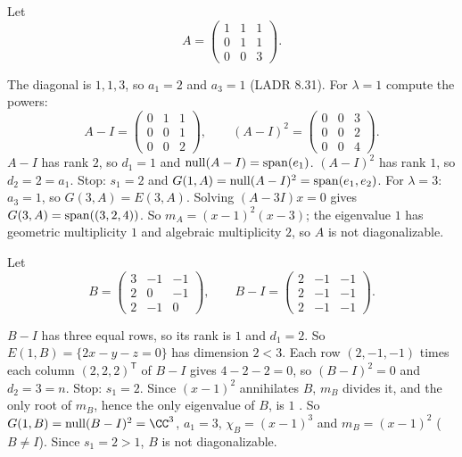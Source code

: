 \documentclass[10pt]{scrartcl}
\begin{document}
\begin{example*}
  Let
  \[
    A=\begin{pmatrix}1&1&1\\0&1&1\\0&0&3\end{pmatrix}.
  \]
  \begin{steps}
    \ii The diagonal is $1,1,3$, so $a_1=2$ and $a_3=1$ (LADR 8.31).
    \ii For $\lambda=1$ compute the powers:
    \[ A-I=\begin{pmatrix}0&1&1\\0&0&1\\0&0&2\end{pmatrix},\qquad (A-I)^2=\begin{pmatrix}0&0&3\\0&0&2\\0&0&4\end{pmatrix}. \]
    $A-I$ has rank $2$, so $d_1=1$ and $\operatorname{null}(A-I)=\operatorname{span}(e_1)$. $(A-I)^2$ has rank $1$, so $d_2=2=a_1$. Stop: $s_1=2$ and $G(1,A)=\operatorname{null}(A-I)^2=\operatorname{span}(e_1,e_2)$.
    \ii For $\lambda=3$: $a_3=1$, so $G(3,A)=E(3,A)$. Solving $(A-3I)x=0$ gives $G(3,A)=\operatorname{span}((3,2,4))$.
    \ii So $m_A=(x-1)^2(x-3)$; the eigenvalue $1$ has geometric multiplicity $1$ and algebraic multiplicity $2$, so $A$ is not diagonalizable.
  \end{steps}
\end{example*}

\begin{example*}
  Let
  \[ B=\begin{pmatrix}3&-1&-1\\2&0&-1\\2&-1&0\end{pmatrix},\qquad B-I=\begin{pmatrix}2&-1&-1\\2&-1&-1\\2&-1&-1\end{pmatrix}. \]
  \begin{steps}
    \ii $B-I$ has three equal rows, so its rank is $1$ and $d_1=2$. So $E(1,B)=\{2x-y-z=0\}$ has dimension $2<3$.
    \ii Each row $(2,-1,-1)$ times each column $(2,2,2)^{\mathsf T}$ of $B-I$ gives $4-2-2=0$, so $(B-I)^2=0$ and $d_2=3=n$. Stop: $s_1=2$.
    \ii Since $(x-1)^2$ annihilates $B$, $m_B$ divides it, and the only root of $m_B$, hence the only eigenvalue of $B$, is $1$ . So $G(1,B)=\nul(B-I)^2=\CC^3$, $a_1=3$, $\chi_B=(x-1)^3$ and $m_B=(x-1)^2$ ($B\ne I$). Since $s_1=2>1$, $B$ is not diagonalizable.
  \end{steps}
\end{example*}
\end{document}
